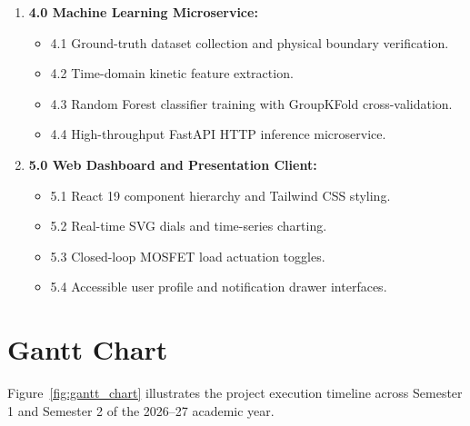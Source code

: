 \begin{enumerate}
    \item \textbf{4.0 Machine Learning Microservice:}
    \begin{itemize}
        \item 4.1 Ground-truth dataset collection and physical boundary verification.
        \item 4.2 Time-domain kinetic feature extraction.
        \item 4.3 Random Forest classifier training with GroupKFold cross-validation.
        \item 4.4 High-throughput FastAPI HTTP inference microservice.
    \end{itemize}
    \item \textbf{5.0 Web Dashboard and Presentation Client:}
    \begin{itemize}
        \item 5.1 React 19 component hierarchy and Tailwind CSS styling.
        \item 5.2 Real-time SVG dials and time-series charting.
        \item 5.3 Closed-loop MOSFET load actuation toggles.
        \item 5.4 Accessible user profile and notification drawer interfaces.
    \end{itemize}
\end{enumerate}

\section{Gantt Chart}
Figure~\ref{fig:gantt_chart} illustrates the project execution timeline across Semester 1 and Semester 2 of the 2026--27 academic year.

